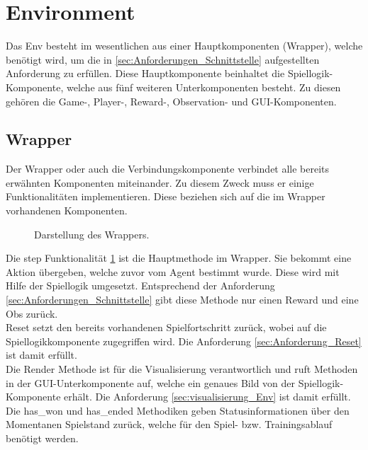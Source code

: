 \section{Environment} \label{sec:Konzept_Environment}
Das Env besteht im wesentlichen aus einer Hauptkomponenten (Wrapper), welche benötigt wird, um die in \ref{sec:Anforderungen_Schnittstelle} aufgestellten Anforderung zu erfüllen. Diese Hauptkomponente beinhaltet die Spiellogik-Komponente, welche aus fünf weiteren Unterkomponenten besteht.
Zu diesen gehören die Game-, Player-, Reward-, Observation- und GUI-Komponenten.

\subsection{Wrapper} \label{sec:Konzept_Wrapper}
Der Wrapper oder auch die Verbindungskomponente verbindet alle bereits erwähnten Komponenten miteinander. Zu diesem Zweck muss er einige Funktionalitäten implementieren. Diese beziehen sich auf die im Wrapper vorhandenen Komponenten.
\begin{figure}[H]
	\centering
	\def\svgscale{0.15}
	
	\caption[Wrapper]{Darstellung des Wrappers.}
	\label{fig:Wrapper}
\end{figure}
Die step Funktionalität \ref{fig:Wrapper} ist die Hauptmethode im Wrapper. Sie bekommt eine Aktion übergeben, welche zuvor vom Agent bestimmt wurde. Diese wird mit Hilfe der Spiellogik umgesetzt. Entsprechend der Anforderung \ref{sec:Anforderungen_Schnittstelle} gibt diese Methode nur einen Reward und eine Obs zurück.\\
Reset setzt den bereits vorhandenen Spielfortschritt zurück, wobei auf die Spiellogikkomponente zugegriffen wird. Die Anforderung \ref{sec:Anforderung_Reset} ist damit erfüllt.\\
Die Render Methode ist für die Visualisierung verantwortlich und ruft Methoden in der GUI-Unterkomponente auf, welche ein genaues Bild von der Spiellogik-Komponente erhält. Die Anforderung \ref{sec:visualisierung_Env} ist damit erfüllt.\\
Die has\_won und has\_ended Methodiken geben Statusinformationen über den Momentanen Spielstand zurück, welche für den Spiel- bzw. Trainingsablauf benötigt werden.

